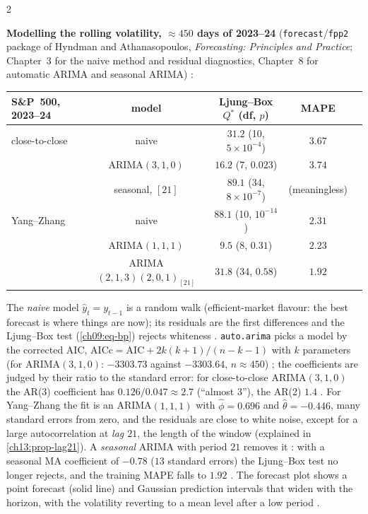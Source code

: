 \begin{paracol}{2}
\begin{secondary}
\medskip
\textbf{Modelling the rolling volatility, $\approx450$ days of 2023--24} (\texttt{forecast}/\texttt{fpp2} package of Hyndman and Athanasopoulos, \emph{Forecasting: Principles and Practice}; Chapter~3 for the naive method and residual diagnostics, Chapter~8 for automatic ARIMA and seasonal ARIMA) :
\begin{center}\small
\begin{tabular}{@{}lcccc@{}}
\toprule
S\&P~500, 2023--24 & model & Ljung--Box $Q^*$ (df, $p$) & MAPE\\
\midrule
close-to-close & naive & $31.2$ (10, $5\times10^{-4}$) & $3.67$\\
 & ARIMA$(3,1,0)$ & $16.2$ (7, $0.023$) & $3.74$\\
 & seasonal, $[21]$ & $89.1$ (34, $8\times10^{-7}$) & (meaningless)\\
Yang--Zhang & naive & $88.1$ (10, $10^{-14}$) & $2.31$\\
 & ARIMA$(1,1,1)$ & $9.5$ (8, $0.31$) & $2.23$\\
 & ARIMA$(2,1,3)(2,0,1)_{[21]}$ & $31.8$ (34, $0.58$) & $1.92$\\
\bottomrule
\end{tabular}
\end{center}
The \emph{naive} model $\hat y_t=y_{t-1}$ is a random walk (efficient-market flavour: the best forecast is where things are now); its residuals are the first
differences and the Ljung--Box test (\cref{ch09:eq-bp}) rejects whiteness . \texttt{auto.arima}
picks a model by the corrected AIC, $\mathrm{AICc}=\mathrm{AIC}+2k(k+1)/(n-k-1)$ with $k$ parameters (for ARIMA$(3,1,0)$: $-3303.73$ against $-3303.64$, $n\approx450$)
; the coefficients are judged by their ratio to the standard error: for
close-to-close ARIMA$(3,1,0)$ the AR(3) coefficient has $0.126/0.047\approx2.7$ (``almost 3''), the AR(2) $1.4$
. For Yang--Zhang the fit is an ARIMA$(1,1,1)$ with $\hat\phi=0.696$ and $\hat\theta=-0.446$, many standard errors from zero, and the
residuals are close to white noise, except for a large autocorrelation at \emph{lag $21$}, the length of the window
 (explained in \cref{ch13:prop-lag21}). A \emph{seasonal} ARIMA with period $21$ removes it
: with a seasonal MA coefficient of $-0.78$ ($13$ standard errors) the Ljung--Box test no longer rejects, and the training MAPE falls to $1.92$
. The forecast plot shows a point forecast (solid line) and Gaussian prediction intervals that widen with the horizon, with the volatility
reverting to a mean level after a low period .


\end{secondary}
\end{paracol}
